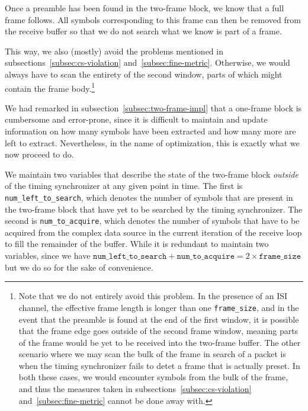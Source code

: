 Once a preamble has been found in the two-frame block, we know that a full
frame follows. All symbols corresponding to this frame can then be removed from
the receive buffer so that we do not search what we know is part of a frame.

This way, we also (mostly) avoid the problems mentioned in
subsections~\ref{subsec:cs-violation} and~\ref{subsec:fine-metric}. Otherwise,
we would always have to scan the entirety of the second window, parts of which
might contain the frame body.\footnote{Note that we do not entirely avoid this
problem. In the presence of an ISI channel, the effective frame length is
longer than one \verb+frame_size+, and in the event that the preamble is found
at the end of the first window, it is possible that the frame edge goes outside
of the second frame window, meaning parts of the frame would be yet to be
received into the two-frame buffer. The other scenario where we may scan the
bulk of the frame in search of a packet is when the timing synchronizer fails
to detet a frame that is actually preset. In both these cases, we would
encounter symbols from the bulk of the frame, and thus the measures taken in
subsections~\ref{subsec:cs-violation} and~\ref{subsec:fine-metric} cannot be
done away with.}


We had remarked in subsection~\ref{subsec:two-frame-impl} that a one-frame
block is cumbersome and error-prone, since it is difficult to maintain and
update information on how many symbols have been extracted and how many more
are left to extract. Nevertheless, in the name of optimization, this is
exactly what we now proceed to do.

\begin{sloppypar}
We maintain two variables that describe the state of the two-frame block
\emph{outside} of the timing synchronizer at any given point in time. The first
is \texttt{num\_left\_to\_search}, which denotes the number of symbols that
are present in the two-frame block that have yet to be searched by the timing
synchronizer. The second is \verb+num_to_acquire+, which denotes the number of
symbols that have to be acquired from the complex data source in the current
iteration of the receive loop to fill the remainder of the buffer. While it is
redundant to maintain two variables, since we have
$\texttt{num\_left\_to\_search} + \texttt{num\_to\_acquire} = 2 \times
\texttt{frame\_size}$ but we do so for the sake of convenience.
\end{sloppypar}

